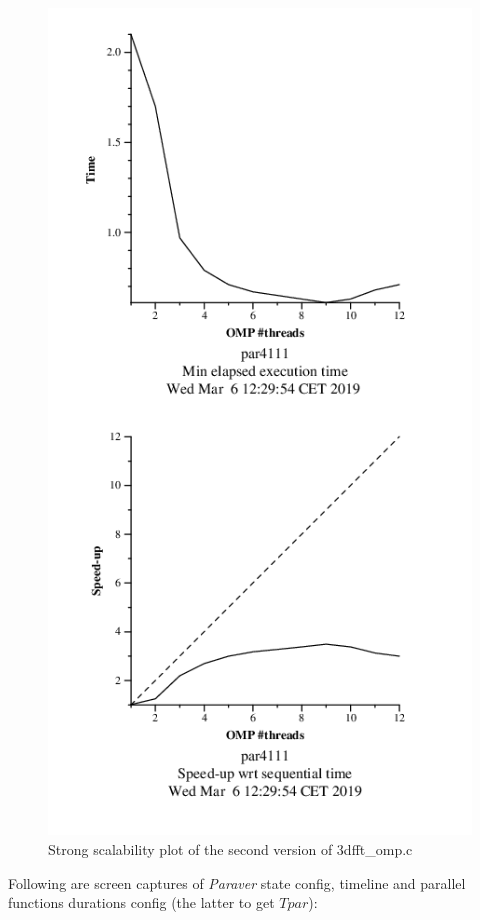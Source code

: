\documentclass[12]{article}
\begin{document}
\begin{figure}[H]
\centering  
\includegraphics[scale=0.5]{images/improved_3dfft/strongPlot.PNG}
  \caption{Strong scalability plot of the second version of 3dfft\_omp.c}
  \label{fig:imp3ddftStrongPlot}
\end{figure}

\bigskip
Following are screen captures of \textit{Paraver} state config, timeline and parallel functions durations config (the latter to get $T{par}$):
\end{document}
